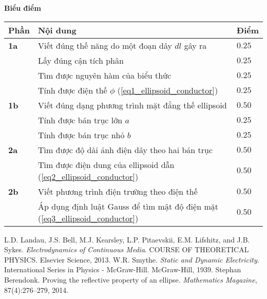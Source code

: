 \textbf{Biểu điểm}
\begin{center}
\begin{tabular}{|>{\centering\arraybackslash}m{1cm}|>{\raggedright\arraybackslash}m{14cm}| >{\centering\arraybackslash}m{1cm}|}
    \hline
    \textbf{Phần} & \textbf{Nội dung} & \textbf{Điểm} \\
    \hline
    \textbf{1a} & Viết đúng thế năng do một đoạn dây $dl$ gây ra & $0.25$ \\
    \cline{2-3}
    & Lấy đúng cận tích phân & $0.25$ \\
    \cline{2-3}
    & Tìm được nguyên hàm của biểu thức & $0.25$ \\
    \cline{2-3} 
    & Tính được điện thế $\phi$ (\ref{eq1_ellipsoid_conductor}) & $0.25$ \\
    \hline
    \textbf{1b} & Viết đúng dạng phương trình mặt đẳng thế ellipsoid & $0.50$ \\
    \cline{2-3}
    & Tính được bán trục lớn $a$ & $0.25$ \\
    \cline{2-3}
    & Tính được bán trục nhỏ $b$  & $0.25$ \\
    \hline
    \textbf{2a} & Tìm được độ dài ảnh điện dây theo hai bán trục & $0.50$ \\
    \cline{2-3}
    & Tìm được điện dung của ellipsoid dẫn (\ref{eq2_ellipsoid_conductor}) & $0.50$ \\
    \hline
    \textbf{2b} & Viết phương trình điện trường theo điện thế & $0.50$ \\
    \cline{2-3}
    & Áp dụng định luật Gauss để tìm mật độ điện mặt (\ref{eq3_ellipsoid_conductor}) & $0.50$ \\ 
    \hline
\end{tabular}
\end{center}


\begin{thebibliography}{}
 L.D. Landau, J.S. Bell, M.J. Kearsley, L.P. Pitaevskii, E.M. Lifshitz, and J.B. Sykes. \textit{Electrodynamics of Continuous Media}. COURSE OF THEORETICAL PHYSICS. Elsevier Science, 2013.
 W.R. Smythe. \textit{Static and Dynamic Electricity}. International Series in Physics - McGraw-Hill. McGraw-Hill, 1939.
 Stephan Berendonk. Proving the reflective property of an ellipse. \textit{Mathematics Magazine}, 87(4):276–279,
2014.
\end{thebibliography}
